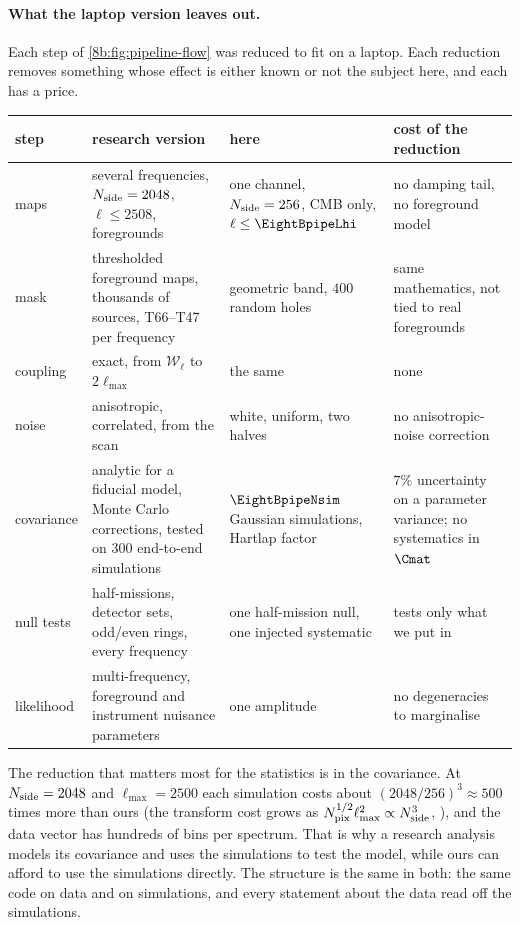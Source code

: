 \paragraph{What the laptop version leaves out.}
Each step of \cref{8b:fig:pipeline-flow} was reduced to fit on a laptop. Each reduction removes
something whose effect is either known or not the subject here, and each has a price.

\begin{taxonomy}
\small
\begin{tabular}{@{}>{\raggedright\arraybackslash}p{1.8cm}>{\raggedright\arraybackslash}p{3.9cm}>{\raggedright\arraybackslash}p{3.1cm}>{\raggedright\arraybackslash}p{3.5cm}@{}}
step & research version & here & cost of the reduction \\
\hline
maps & several frequencies, $N_{\rm side}=2048$, $\ell\le2508$, foregrounds & one channel, $N_{\rm side}=256$, CMB only, $\ell\le\EightBpipeLhi$ & no damping tail, no foreground model \\
mask & thresholded foreground maps, thousands of sources, T66--T47 per frequency & geometric band, $400$ random holes & same mathematics, not tied to real foregrounds \\
coupling & exact, from $\mathcal W_\ell$ to $2\ell_{\max}$ & the same & none \\
noise & anisotropic, correlated, from the scan & white, uniform, two halves & no anisotropic-noise correction \\
covariance & analytic for a fiducial model, Monte Carlo corrections, tested on $300$ end-to-end simulations & $\EightBpipeNsim$ Gaussian simulations, Hartlap factor & $7\%$ uncertainty on a parameter variance; no systematics in $\Cmat$ \\
null tests & half-missions, detector sets, odd/even rings, every frequency & one half-mission null, one injected systematic & tests only what we put in \\
likelihood & multi-frequency, foreground and instrument nuisance parameters & one amplitude & no degeneracies to marginalise \\
\end{tabular}
\end{taxonomy}

The reduction that matters most for the statistics is in the covariance. At $N_{\rm side}=2048$ and
$\ell_{\max}=2500$ each simulation costs about $(2048/256)^3\approx500$ times more than ours (the transform cost
grows as $N_{\rm pix}^{1/2}\ell_{\max}^2\propto N_{\rm side}^3$, ), and the data vector has hundreds of bins
per spectrum. That is why a research analysis models its covariance and uses the simulations to test
the model, while ours can afford to use the simulations directly. The structure is the same in both:
the same code on data and on simulations, and every statement about the data read off the
simulations.

